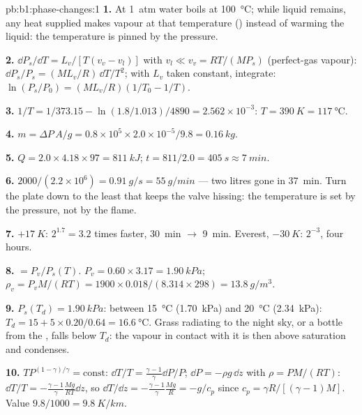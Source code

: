 \begin{solution}{pb:b1:phase-changes:1}
\textbf{1.} At \qty{1}{atm} water boils at \qty{100}{\degreeCelsius}; while
liquid remains, any heat supplied makes vapour at that temperature
() instead of warming the liquid: the temperature is pinned
by the pressure.

\textbf{2.} $\dd P_s/\dd T = L_v/[T(v_v - v_l)]$ with $v_l \ll v_v = RT/(MP_s)$
(perfect-gas vapour): $\dd P_s/P_s = (ML_v/R)\,\dd T/T^2$; with $L_v$ taken
constant, integrate: $\ln(P_s/P_0) = (ML_v/R)(1/T_0 - 1/T)$.

\textbf{3.} $1/T = 1/373.15 - \ln(1.8/1.013)/4890 = 2.562 \times 10^{-3}$: $T =
\qty{390}{K} = \qty{117}{\degreeCelsius}$.

\textbf{4.} $m = \Delta P\,A/g = 0.8 \times 10^5 \times 2.0 \times 10^{-5}/9.8 =
\qty{0.16}{kg}$.

\textbf{5.} $Q = 2.0 \times 4.18 \times 97 = \qty{811}{kJ}$; $t = 811/2.0 =
\qty{405}{s} \approx \qty{7}{min}$.

\textbf{6.} $2000/(2.2 \times 10^6) = \qty{0.91}{g/s} = \qty{55}{g/min}$ --- two
litres gone in \qty{37}{min}. Turn the plate down to the least that
keeps the valve hissing: the temperature is set by the pressure, not by
the flame.

\textbf{7.} $+\qty{17}{K}$: $2^{1.7} = 3.2$ times faster, \qty{30}{min}
$\to$ \qty{9}{min}. Everest, $-\qty{30}{K}$: $2^{-3}$, four hours.

\textbf{8.}  $= P_v/P_s(T)$. $P_v = 0.60 \times 3.17 =
\qty{1.90}{kPa}$; $\rho_v = P_vM/(RT) = 1900 \times 0.018/(8.314 \times 298) =
\qty{13.8}{g/m^3}$.

\textbf{9.} $P_s(T_d) = \qty{1.90}{kPa}$: between \qty{15}{\degreeCelsius}
(\qty{1.70}{kPa}) and \qty{20}{\degreeCelsius} (\qty{2.34}{kPa}): $T_d = 15 + 5 \times 0.20/0.64
= \qty{16.6}{\degreeCelsius}$. Grass radiating to the night sky, or a
bottle from the , falls below $T_d$: the vapour in contact
with it is then above saturation and condenses.

\textbf{10.} $TP^{(1-\gamma)/\gamma} = \text{const}$: $\dd T/T = \frac{\gamma - 1}{\gamma}
\dd P/P$; $\dd P = -\rho g\,\dd z$ with $\rho = PM/(RT)$: $\dd T/T = -\frac{\gamma -
1}{\gamma}\frac{Mg}{RT}\dd z$, so $\dd T/\dd z = -\frac{\gamma - 1}{\gamma}\frac{Mg}{R} =
-g/c_p$ since $c_p = \gamma R/[(\gamma - 1)M]$. Value $9.8/1000 = \qty{9.8}{K/km}$.


\end{solution}
